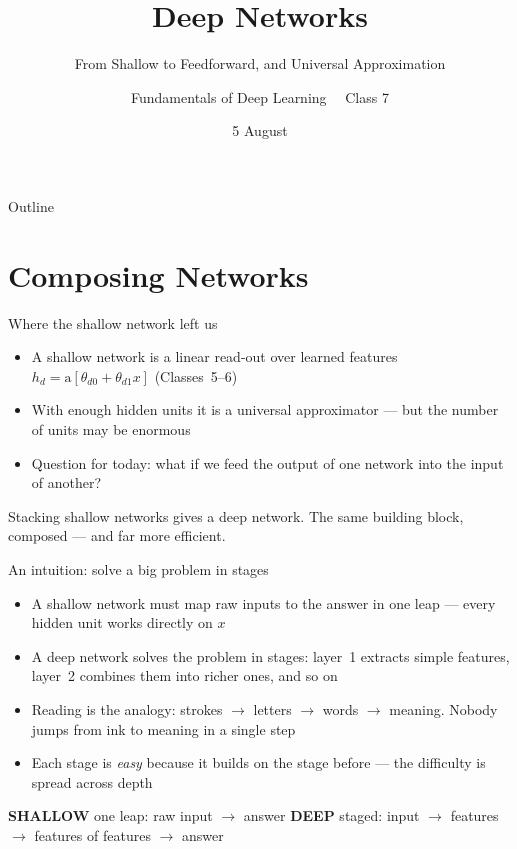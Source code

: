 \documentclass[aspectratio=169, 11pt]{beamer}
\title{Deep Networks}
\subtitle{From Shallow to Feedforward, and Universal Approximation}
\author{Fundamentals of Deep Learning \ \textperiodcentered\ Class 7}
\institute{Prof.~Nirav Bhatt}
\date{5 August}
\newcommand{\shpar}[2]{%
  \vfill
  {\footnotesize
  \begin{tcolorbox}[enhanced, sidebyside, sidebyside align=top,
                    lefthand ratio=0.485,
                    segmentation style={shc!35, line width=0.6pt},
                    colback=shc!5, colframe=shc!35, boxrule=0.5pt,
                    arc=1.5mm, left=2mm, right=2mm, top=0.8mm, bottom=0.8mm]
    {\color{shc}\textbf{SHALLOW}}\;\; #1
  \tcblower
    {\color{dpc}\textbf{DEEP}}\;\; #2
  \end{tcolorbox}}%
  \vspace{0.6em}%
}
\begin{document}
\maketitle

\begin{frame}{Outline}
  \tableofcontents
\end{frame}

\section{Composing Networks}

\begin{frame}{Where the shallow network left us}
  \begin{itemize}
    \item A shallow network is a linear read-out over
          \alert{learned features} $h_d=\mathrm{a}[\theta_{d0}
          +\theta_{d1}x]$ (Classes~5--6)
    \item With enough hidden units it is a
          \alert{universal approximator} --- but the number of
          units may be enormous
    \item Question for today: what if we feed the output of
          one network into the \alert{input of another}?
  \end{itemize}
  \vspace{0.3em}
  \begin{redhighlight}
    Stacking shallow networks gives a \alert{deep network}.
    The same building block, composed --- and far more
    efficient.
  \end{redhighlight}
\end{frame}

\begin{frame}{An intuition: solve a big problem in stages}
  \begin{itemize}
    \item A shallow network must map raw inputs to the answer
          in \alert{one leap} --- every hidden unit works
          directly on $x$
    \item A deep network solves the problem in
          \alert{stages}: layer~1 extracts simple features,
          layer~2 combines them into richer ones, and so on
    \item Reading is the analogy: \alert{strokes $\to$
          letters $\to$ words $\to$ meaning}. Nobody jumps
          from ink to meaning in a single step
    \item Each stage is \emph{easy} because it builds on the
          stage before --- the difficulty is \alert{spread
          across depth}
  \end{itemize}
  \shpar{one leap: raw input $\to$ answer}
        {staged: input $\to$ features $\to$ features of
         features $\to$ answer}
\end{frame}
\end{document}
